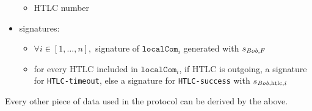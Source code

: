\begin{itemize}
\begin{itemize}
        \item HTLC number
      \end{itemize}
    \item signatures:
    \begin{itemize}
      \item $\forall i \in [1, \dots, n],$ signature of $\mathtt{localCom}_i$
      generated with $s_{\mathit{Bob}, F}$
      \item for every HTLC included in $\mathtt{localCom}_i$, if HTLC is
      outgoing, a signature for \texttt{HTLC-timeout}, else a signature for
      \texttt{HTLC-success} with $s_{\mathit{Bob}, \mathrm{htlc}, i}$
    \end{itemize}
  \end{itemize}
  Every other piece of data used in the protocol can be derived by the above.
